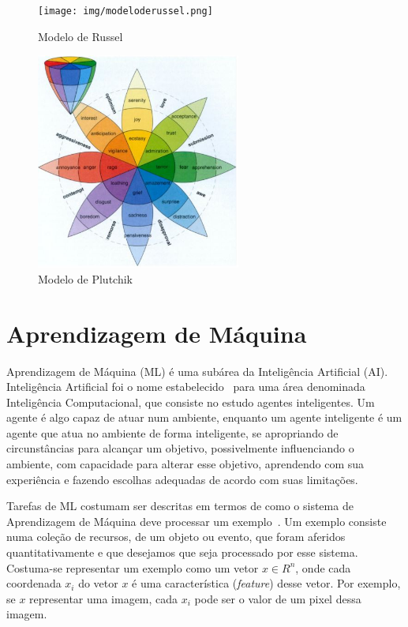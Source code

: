 \begin{figure}[!ht]
\centering
\texttt{[image: img/modeloderussel.png]}
\caption{\label{fig:russel}Modelo de Russel~\cite{img_russel}}
\end{figure}

\begin{figure}[!h]
\centering
\includegraphics[width=0.6\textwidth]{img/plutchik.JPG}
\caption{\label{fig:plutchik}Modelo de Plutchik~\cite{57}}
\end{figure}

\section{Aprendizagem de Máquina}\label{sec:ml}

Aprendizagem de Máquina (\acrshort{ML}) é uma subárea da Inteligência Artificial (\acrshort{AI}). Inteligência Artificial foi o nome estabelecido~\cite{12.23} para uma área denominada Inteligência Computacional, que consiste no estudo agentes inteligentes. Um agente é algo capaz de atuar num ambiente, enquanto um agente inteligente é um agente que atua no ambiente de forma inteligente, se apropriando de circunstâncias para alcançar um objetivo, possivelmente influenciando o ambiente, com capacidade para alterar esse objetivo, aprendendo com sua experiência e fazendo escolhas adequadas de acordo com suas limitações.

Tarefas de \acrshort{ML} costumam ser descritas em termos de como o sistema de Aprendizagem de Máquina deve processar um exemplo~\cite{53}. Um exemplo consiste numa coleção de recursos, de um objeto ou evento, que foram aferidos quantitativamente e que desejamos que seja processado por esse sistema. Costuma-se representar um exemplo como um vetor $x \in R^n$, onde cada coordenada $x_i$ do vetor $x$ é uma característica (\textit{feature}) desse vetor. Por exemplo, se $x$ representar uma imagem, cada $x_i$ pode ser o valor de um pixel dessa imagem.

